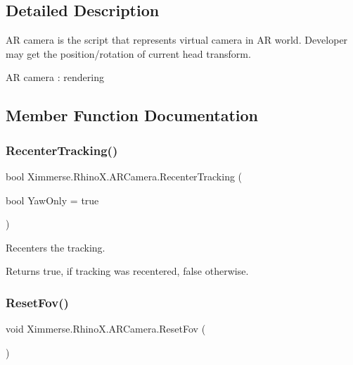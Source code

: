 \subsection{Detailed Description}
AR camera is the script that represents virtual camera in AR world. Developer may get the position/rotation of current head transform. 

AR camera \+: rendering 

\subsection{Member Function Documentation}
\mbox{\label{class_ximmerse_1_1_rhino_x_1_1_a_r_camera_a4b8e8609b5b3c5cc7e9722be7e11caff}} 
\subsubsection{\texorpdfstring{Recenter\+Tracking()}{RecenterTracking()}}
{\footnotesize\ttfamily bool Ximmerse.\+Rhino\+X.\+A\+R\+Camera.\+Recenter\+Tracking (\begin{DoxyParamCaption}\item[{bool}]{Yaw\+Only = {\ttfamily true} }\end{DoxyParamCaption})}



Recenters the tracking. 

\begin{DoxyReturn}{Returns}
{\ttfamily true}, if tracking was recentered, {\ttfamily false} otherwise.
\end{DoxyReturn}
\mbox{\label{class_ximmerse_1_1_rhino_x_1_1_a_r_camera_a8990c22f1fd7eadc81fc8cce26e307ad}} 
\subsubsection{\texorpdfstring{Reset\+Fov()}{ResetFov()}}
{\footnotesize\ttfamily void Ximmerse.\+Rhino\+X.\+A\+R\+Camera.\+Reset\+Fov (\begin{DoxyParamCaption}{ }\end{DoxyParamCaption})}



